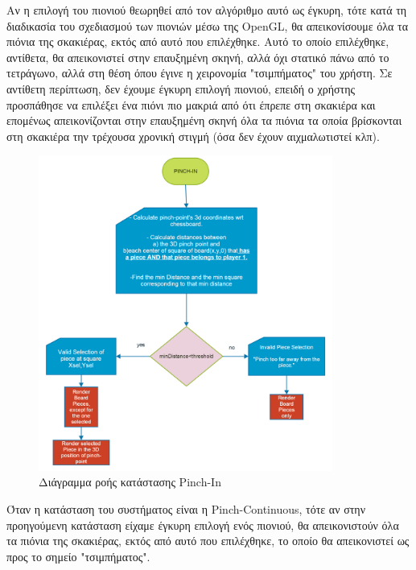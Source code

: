 Αν η επιλογή του πιονιού θεωρηθεί από τον αλγόριθμο αυτό ως έγκυρη, τότε κατά τη διαδικασία του σχεδιασμού των πιονιών μέσω της OpenGL, θα απεικονίσουμε όλα τα πιόνια της σκακιέρας, εκτός από αυτό που επιλέχθηκε. Αυτό το οποίο επιλέχθηκε, αντίθετα, θα απεικονιστεί στην επαυξημένη σκηνή, αλλά όχι στατικό πάνω από το τετράγωνο, αλλά στη θέση όπου έγινε η χειρονομία "τσιμπήματος" του χρήστη. Σε αντίθετη περίπτωση, δεν έχουμε έγκυρη επιλογή πιονιού, επειδή ο χρήστης προσπάθησε να επιλέξει ένα πιόνι πιο μακριά από ότι έπρεπε στη σκακιέρα και επομένως απεικονίζονται στην επαυξημένη σκηνή όλα τα πιόνια τα οποία βρίσκονται στη σκακιέρα την τρέχουσα χρονική στιγμή (όσα δεν έχουν αιχμαλωτιστεί κλπ).




\begin{figure}[H]
    \centering
    \includegraphics[width=0.86\textwidth]{Files/Figures/pinch_in.png}
    \caption[Διάγραμμα ροής κατάστασης Pinch-In]{Διάγραμμα ροής κατάστασης Pinch-In}
    \label{fig:pinch-in}
\end{figure}


Όταν η κατάσταση του συστήματος είναι η Pinch-Continuous, τότε αν στην προηγούμενη κατάσταση είχαμε έγκυρη επιλογή ενός πιονιού, θα απεικονιστούν όλα τα πιόνια της σκακιέρας, εκτός από αυτό που επιλέχθηκε, το οποίο θα απεικονιστεί ως προς το σημείο "τσιμπήματος". 

